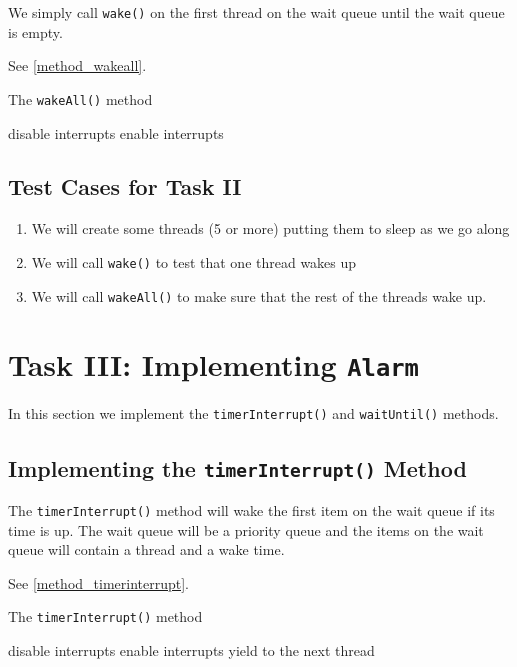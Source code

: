 \documentclass[12pt, letterpaper]{report}
\newcommand{\code}[1]{\texttt{#1}}
\begin{document}
We simply call \code{wake()} on the first thread on the wait queue until the wait queue is empty.

See \vref{method_wakeall}.

\begin{algorithm}[!ht]
  \caption{The \code{wakeAll()} method}
  \label{method_wakeall}
    \SetAlgoLined
    disable interrupts\;
    enable interrupts
\end{algorithm}

\subsection*{Test Cases for Task II}

\begin{enumerate}
\item We will create some threads (5 or more) putting them to sleep as we go along
\item We will call \code{wake()} to test that one thread wakes up
\item We will call \code{wakeAll()} to make sure that the rest of the threads wake up.
\end{enumerate}

\section*{Task III: Implementing \code{Alarm}}

In this section we implement the \code{timerInterrupt()} and \code{waitUntil()} methods.

\subsection*{Implementing the \code{timerInterrupt()} Method}

The \code{timerInterrupt()} method will wake the first item on the wait queue if its time is up. The wait queue will be a priority queue and the items on the wait queue will contain a thread and a wake time.

See \vref{method_timerinterrupt}.

\begin{algorithm}[!ht]
  \caption{The \code{timerInterrupt()} method}
  \label{method_timerinterrupt}
    \SetAlgoLined
    disable interrupts\;
    enable interrupts\;
    yield to the next thread\;
\end{algorithm}
\end{document}
